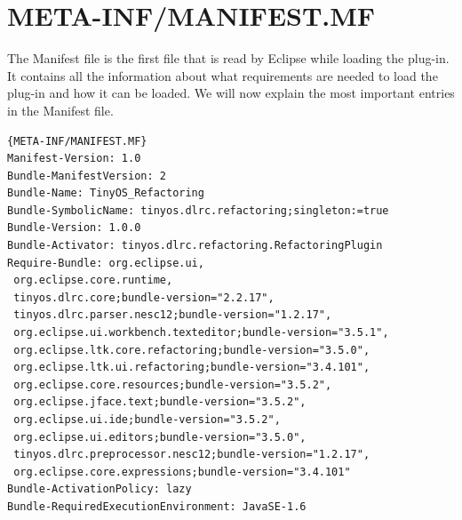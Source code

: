 \documentclass[a4paper,10pt]{report}
\begin{document}
\section{META-INF/MANIFEST.MF}
The Manifest file is the first file that is read by Eclipse while loading the plug-in. It contains all the information about what requirements 
are needed to load the plug-in and how it can be loaded. We will now explain the most important entries in the Manifest file.

\begin{lstlisting}[caption=MANIFEST]{META-INF/MANIFEST.MF}
Manifest-Version: 1.0
Bundle-ManifestVersion: 2
Bundle-Name: TinyOS_Refactoring
Bundle-SymbolicName: tinyos.dlrc.refactoring;singleton:=true
Bundle-Version: 1.0.0
Bundle-Activator: tinyos.dlrc.refactoring.RefactoringPlugin
Require-Bundle: org.eclipse.ui,
 org.eclipse.core.runtime,
 tinyos.dlrc.core;bundle-version="2.2.17",
 tinyos.dlrc.parser.nesc12;bundle-version="1.2.17",
 org.eclipse.ui.workbench.texteditor;bundle-version="3.5.1",
 org.eclipse.ltk.core.refactoring;bundle-version="3.5.0",
 org.eclipse.ltk.ui.refactoring;bundle-version="3.4.101",
 org.eclipse.core.resources;bundle-version="3.5.2",
 org.eclipse.jface.text;bundle-version="3.5.2",
 org.eclipse.ui.ide;bundle-version="3.5.2",
 org.eclipse.ui.editors;bundle-version="3.5.0",
 tinyos.dlrc.preprocessor.nesc12;bundle-version="1.2.17",
 org.eclipse.core.expressions;bundle-version="3.4.101"
Bundle-ActivationPolicy: lazy
Bundle-RequiredExecutionEnvironment: JavaSE-1.6
\end{lstlisting}
\end{document}
